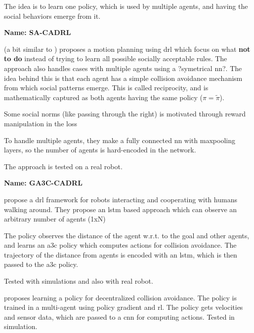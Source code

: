 The idea is to learn one policy, which is used by multiple agents, and having the social behaviors emerge from it.




\textbf{Name: SA-CADRL}

\cite{chen2017socially} (a bit similar to \cite{chen2017decentralized}) proposes a motion planning using \gls{drl} which focus on what \textbf{not to do} instead of trying to learn all possible socially acceptable rules.
%
The approach also handles cases with multiple agents using a ?symetrical \gls{nn}?.
%
The idea behind this is that each agent has a simple collision avoidance mechanism from which social patterns emerge.
%
This is called reciprocity, and is mathematically captured as both agents having the same policy ($\pi = \tilde{\pi}$).

Some social norms (like passing through the right) is motivated through reward manipulation in the loss 

To handle multiple agents, they make a fully connected \gls{nn} with maxpooling layers, so the number of agents is hard-encoded in the network.

The approach is tested on a real robot.




\textbf{Name: GA3C-CADRL}

\cite{everett2018motion} propose a \gls{drl} framework for robots interacting and cooperating with humans walking around.
%
They propose an \gls{lstm} based approach which can observe an arbitrary number of agents (1xN)

The policy observes the distance of the agent w.r.t. to the goal and other agents, and learns an \gls{a3c} policy which computes actions for collision avoidance.
%
The trajectory of the distance from agents is encoded with an \gls{lstm}, which is then passed to the \gls{a3c} policy.

Tested with simulations and also with real robot.


\cite{long2018towards} proposes learning a policy for decentralized collision avoidance.
%
The policy is trained in a multi-agent  using policy gradient and \gls{rl}.
%
The policy gets velocities and sensor data, which are passed to a \gls{cnn} for computing actions.
%
Tested in simulation.
%

